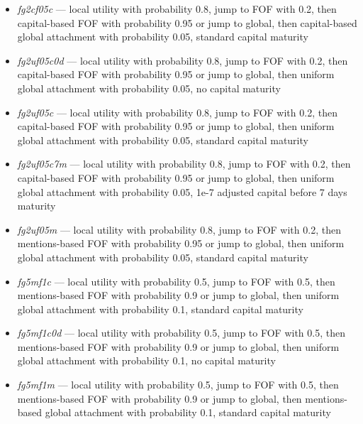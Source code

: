 \documentclass[10pt,oneside]{memoir}
\begin{document}
\begin{itemize}


\item {\itshape fg2cf05c} --- local utility with probability 0.8, jump to FOF with 0.2, then capital-based FOF with probability 0.95 or jump to global, then capital-based global attachment with probability 0.05, standard capital maturity

\item {\itshape fg2uf05c0d} --- local utility with probability 0.8, jump to FOF with 0.2, then capital-based FOF with probability 0.95 or jump to global, then uniform global attachment with probability 0.05, no capital maturity

\item {\itshape fg2uf05c} --- local utility with probability 0.8, jump to FOF with 0.2, then capital-based FOF with probability 0.95 or jump to global, then uniform global attachment with probability 0.05, standard capital maturity

\item {\itshape fg2uf05c7m} --- local utility with probability 0.8, jump to FOF with 0.2, then capital-based FOF with probability 0.95 or jump to global, then uniform global attachment with probability 0.05, 1e-7 adjusted capital before 7 days maturity

\item {\itshape fg2uf05m} --- local utility with probability 0.8, jump to FOF with 0.2, then mentions-based FOF with probability 0.95 or jump to global, then uniform global attachment with probability 0.05, standard capital maturity

\item {\itshape fg5mf1c} --- local utility with probability 0.5, jump to FOF with 0.5, then mentions-based FOF with probability 0.9 or jump to global, then uniform global attachment with probability 0.1, standard capital maturity

\item {\itshape fg5mf1c0d} --- local utility with probability 0.5, jump to FOF with 0.5, then mentions-based FOF with probability 0.9 or jump to global, then uniform global attachment with probability 0.1, no capital maturity

\item {\itshape fg5mf1m} --- local utility with probability 0.5, jump to FOF with 0.5, then mentions-based FOF with probability 0.9 or jump to global, then mentions-based global attachment with probability 0.1, standard capital maturity


\end{itemize}
\end{document}
